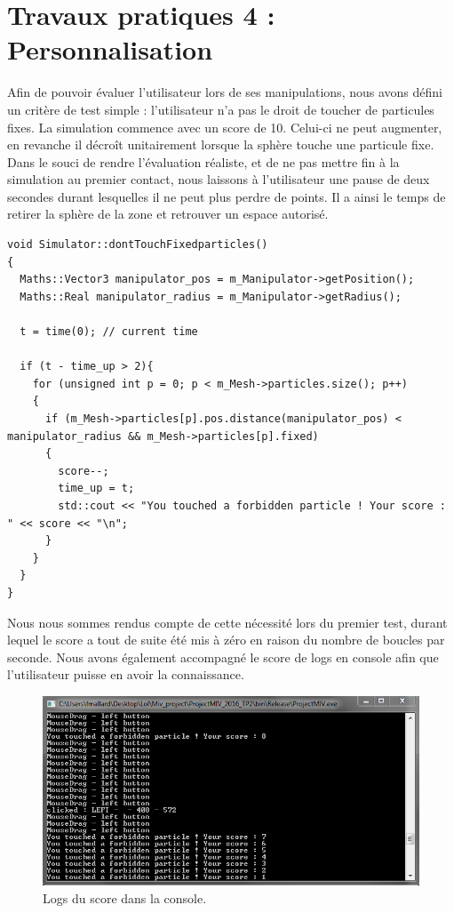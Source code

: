 \documentclass[a4paper,12pt]{article}
\begin{document}
\newpage\section{Travaux pratiques 4 : Personnalisation}

Afin de pouvoir évaluer l'utilisateur lors de ses manipulations, nous avons défini un critère de test simple : l'utilisateur n'a pas le droit de toucher de particules fixes.
La simulation commence avec un score de 10. Celui-ci ne peut augmenter, en revanche il décroît unitairement lorsque la sphère touche une particule fixe.
Dans le souci de rendre l'évaluation réaliste, et de ne pas mettre fin à la simulation au premier contact, nous laissons à l'utilisateur une \og{}pause\fg{} de deux secondes durant lesquelles il ne peut plus perdre de points. Il a ainsi le temps de retirer la sphère de la zone et retrouver un espace autorisé.
\begin{lstlisting}
void Simulator::dontTouchFixedparticles()
{
  Maths::Vector3 manipulator_pos = m_Manipulator->getPosition();
  Maths::Real manipulator_radius = m_Manipulator->getRadius();

  t = time(0); // current time

  if (t - time_up > 2){
    for (unsigned int p = 0; p < m_Mesh->particles.size(); p++)
    {
      if (m_Mesh->particles[p].pos.distance(manipulator_pos) < manipulator_radius && m_Mesh->particles[p].fixed)
      {
        score--;
        time_up = t;
        std::cout << "You touched a forbidden particle ! Your score : " << score << "\n";
      }
    }
  }
}
\end{lstlisting}

Nous nous sommes rendus compte de cette nécessité lors du premier test, durant lequel le score a tout de suite été mis à zéro en raison du nombre de boucles par seconde.
Nous avons également accompagné le score de logs en console afin que l'utilisateur puisse en avoir la connaissance.
\begin{figure}[ht!]
  \centering
  \includegraphics[width=\textwidth]{images/score_console.png}
  \caption{Logs du score dans la console.}
  \label{fig:score_console}
\end{figure}
\end{document}
